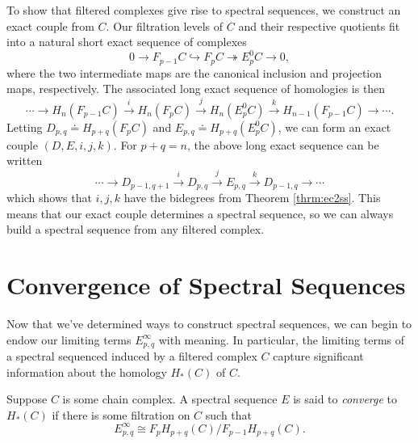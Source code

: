 \documentclass[twoside,10pt]{article}
\begin{document}
To show that filtered complexes give rise to spectral sequences, we construct an exact couple from $C$. Our filtration levels of $C$ and their respective quotients fit into a natural short exact sequence of complexes
\[
0 \to  F_{p-1}C \hookrightarrow F_{p}C \twoheadrightarrow E_{p}^{0}C \to 0,
\] where the two intermediate maps are the canonical inclusion and projection maps, respectively. The associated long exact sequence of homologies is then
\[
	\cdots \to H_{n}(F_{p-1}C) \stackrel{i}{\to }  H_{n}(F_{p}C) \stackrel{j}{\to }  H_{n}(E_{p}^{0}C) \stackrel{k}{\to }  H_{n-1}(F_{p-1}C) \to \cdots.
\] 
Letting $D_{p,q} \doteq H_{p+q}(F_{p}C)$ and $E_{p,q} \doteq H_{p+q}(E_{p}^{0}C)$, we can form an exact couple $(D, E, i, j, k)$. For $p+q=n$, the above long exact sequence can be written
\[
	\cdots \to D_{p-1,q+1} \stackrel{i}{\to } D_{p,q} \stackrel{j}{\to } E_{p,q} \stackrel{k}{\to } D_{p-1,q} \to \cdots
\] which shows that $i,j,k$ have the bidegrees from Theorem \ref{thrm:ec2ss}. This means that our exact couple determines a spectral sequence, so we can always build a spectral sequence from any filtered complex.



\section{Convergence of Spectral Sequences}

Now that we've determined ways to construct spectral sequences, we can begin to endow our limiting terms $E_{p,q}^{\infty}$ with meaning. In particular, the limiting terms of a spectral sequenced induced by a filtered complex $C$ capture significant information about the homology $H_*(C)$ of $C$.

\begin{defn}[]
	Suppose $C$ is some chain complex. A spectral sequence $E$ is said to \textit{converge} to $H_*(C)$ if there is some filtration on $C$ such that
	\[
		E_{p,q}^{\infty} \cong F_{p}H_{p+q}(C) / F_{p-1} H_{p+q}(C).
	\] 
\end{defn}
\end{document}

